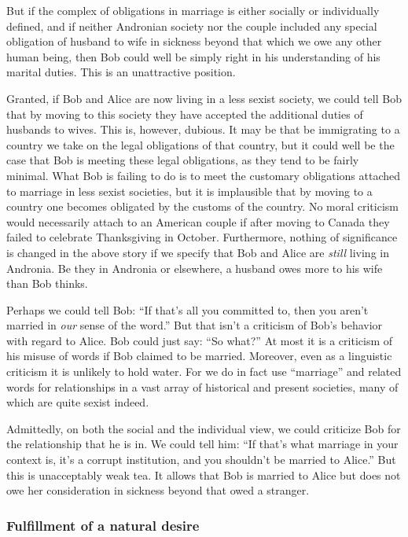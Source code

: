 But if the complex of obligations in marriage is either socially or individually defined, and if neither Andronian society nor the couple included 
any special obligation of husband to wife in sickness beyond that which we owe any other human being, then Bob could well be simply right in his understanding
of his marital duties. This is an unattractive position. 

Granted, if Bob and Alice are now living in a less sexist society, we could tell Bob that by moving to this society they have accepted the additional 
duties of husbands to wives. This is, however, dubious. It may be that be immigrating to a country we take on the legal obligations of that 
country, but it could well be the case that Bob is meeting these legal obligations, as they tend to be fairly minimal. What Bob is failing to do is
to meet the customary obligations attached to marriage in less sexist societies, but it is implausible that by moving to a country one becomes obligated
by the customs of the country. No moral criticism would necessarily attach to an American couple if after moving to Canada they failed to celebrate 
Thanksgiving in October. Furthermore, nothing of significance is changed in the above story if we specify that Bob and Alice are \textit{still} living in 
Andronia. Be they in Andronia or elsewhere, a husband owes more to his wife than Bob thinks.

Perhaps we could tell Bob: ``If that's all you committed to, then you aren't married in \textit{our} sense of the word.'' 
But that isn't a criticism of Bob's behavior with regard to Alice. Bob could just say: ``So what?'' At most it is a criticism of his misuse of words if Bob 
claimed to be  married. Moreover, even as a linguistic criticism it is unlikely to hold water. For we do in fact use ``marriage'' and related words for relationships in
a vast array of historical and present societies, many of which are quite sexist indeed.

Admittedly, on both the social and the individual view, we could criticize Bob for the relationship that he is in. We could tell him: ``If that's what marriage
in your context is, it's a corrupt institution, and you shouldn't be married to Alice.'' But this is unacceptably weak tea. It allows that Bob is married to Alice but does
not owe her consideration in sickness beyond that owed a stranger.

\subsubsection{Fulfillment of a natural desire}

